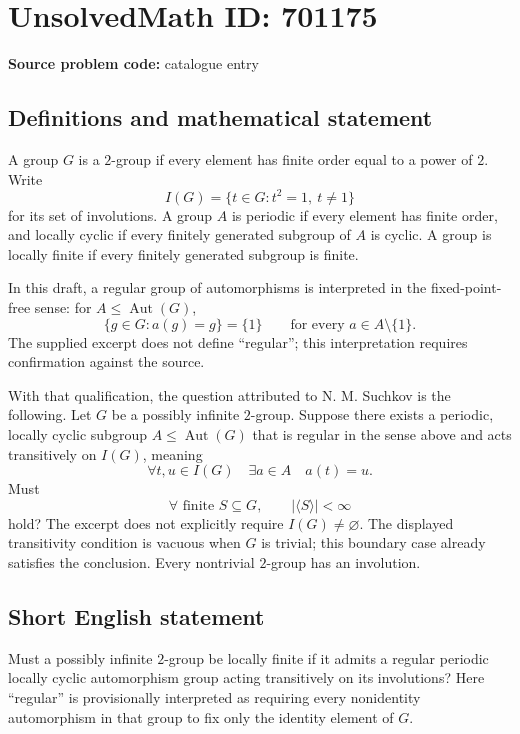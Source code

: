 \documentclass[11pt]{article}
\begin{document}
\section*{UnsolvedMath ID: 701175}
\textbf{Source problem code:} catalogue entry
\subsection{Definitions and mathematical statement}
A group \(G\) is a \(2\)-group if every element has finite order equal to a power of \(2\). Write
\[
I(G)=\{t\in G:t^2=1,\ t\ne1\}
\]
for its set of involutions. A group \(A\) is periodic if every element has finite order, and locally cyclic if every finitely generated subgroup of \(A\) is cyclic. A group is locally finite if every finitely generated subgroup is finite.

In this draft, a regular group of automorphisms is interpreted in the fixed-point-free sense: for \(A\leq\operatorname{Aut}(G)\),
\[
\{g\in G:a(g)=g\}=\{1\}
\qquad\text{for every }a\in A\setminus\{1\}.
\]
The supplied excerpt does not define ``regular''; this interpretation requires confirmation against the source.

With that qualification, the question attributed to N. M. Suchkov is the following. Let \(G\) be a possibly infinite \(2\)-group. Suppose there exists a periodic, locally cyclic subgroup \(A\leq\operatorname{Aut}(G)\) that is regular in the sense above and acts transitively on \(I(G)\), meaning
\[
\forall t,u\in I(G)\quad\exists a\in A\quad a(t)=u.
\]
Must
\[
\forall\text{ finite }S\subseteq G,\qquad |\langle S\rangle|<\infty
\]
hold? The excerpt does not explicitly require \(I(G)\ne\varnothing\). The displayed transitivity condition is vacuous when \(G\) is trivial; this boundary case already satisfies the conclusion. Every nontrivial \(2\)-group has an involution.
\subsection{Short English statement}
Must a possibly infinite \(2\)-group be locally finite if it admits a regular periodic locally cyclic automorphism group acting transitively on its involutions? Here ``regular'' is provisionally interpreted as requiring every nonidentity automorphism in that group to fix only the identity element of \(G\).
\end{document}
